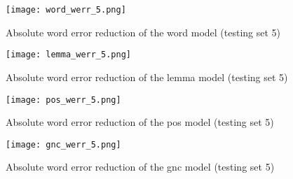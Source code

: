 %
%
%

\begin{figure}[!htbp]
	  \centering
	  \texttt{[image: word\_werr\_5.png]}
	      \caption{Absolute word error reduction of the word model (testing set 5)}
	      \label{figure:word5}
\end{figure}

\begin{figure}[!htbp]
	  \centering
	  \texttt{[image: lemma\_werr\_5.png]}
	      \caption{Absolute word error reduction of the lemma model (testing set 5)}
	      \label{figure:lemmy5}
\end{figure}

\begin{figure}[!htbp]
	  \centering
	  \texttt{[image: pos\_werr\_5.png]}
	      \caption{Absolute word error reduction of the pos model (testing set 5)}
	      \label{figure:pos5}
\end{figure}

\begin{figure}[!htbp]
	  \centering
	  \texttt{[image: gnc\_werr\_5.png]}
	      \caption{Absolute word error reduction of the gnc model (testing set 5)}
	      \label{figure:gnc5}
\end{figure}

